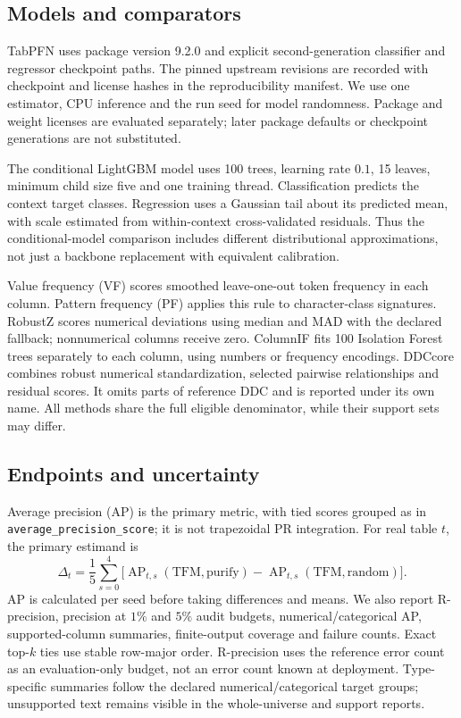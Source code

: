 \subsection{Models and comparators}
TabPFN uses package version 9.2.0 and explicit second-generation classifier
and regressor checkpoint paths. The pinned upstream revisions are recorded
with checkpoint and license hashes in the reproducibility manifest. We use
one estimator, CPU inference and the run seed for model randomness. Package
and weight licenses are evaluated separately; later package defaults or
checkpoint generations are not substituted.

The conditional LightGBM model uses 100 trees, learning rate $0.1$, 15 leaves,
minimum child size five and one training thread. Classification predicts the
context target classes. Regression uses a Gaussian tail about its predicted
mean, with scale estimated from within-context cross-validated residuals.
Thus the conditional-model comparison includes different distributional
approximations, not just a backbone replacement with equivalent calibration.

Value frequency (VF) scores smoothed leave-one-out token frequency in each
column. Pattern frequency (PF) applies this rule to character-class signatures.
RobustZ scores numerical deviations using median and MAD with the declared
fallback; nonnumerical columns receive zero. ColumnIF fits 100 Isolation Forest
trees separately to each column, using numbers or frequency encodings.
DDCcore combines robust numerical standardization, selected pairwise
relationships and residual scores. It omits parts of reference DDC and is
reported under its own name. All methods share the full eligible denominator,
while their support sets may differ.

\subsection{Endpoints and uncertainty}
Average precision (AP) is the primary metric, with tied scores grouped as in
\texttt{average\_precision\_score}; it is not trapezoidal PR integration.
For real table $t$, the primary estimand is
\begin{equation}
 \Delta_t=\frac{1}{5}\sum_{s=0}^4
  \bigl[\operatorname{AP}_{t,s}(\mathrm{TFM,purify})-
        \operatorname{AP}_{t,s}(\mathrm{TFM,random})\bigr].
\end{equation}
AP is calculated per seed before taking differences and means. We also report
R-precision, precision at $1\%$ and $5\%$ audit budgets, numerical/categorical
AP, supported-column summaries, finite-output coverage and failure counts.
Exact top-$k$ ties use stable row-major order. R-precision uses the reference error
count as an evaluation-only budget, not an error count known at deployment.
Type-specific summaries follow the declared numerical/categorical target groups;
unsupported text remains visible in the whole-universe and support reports.

